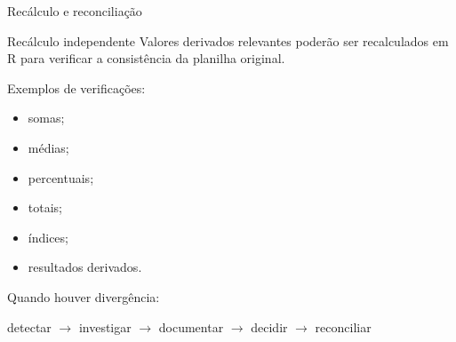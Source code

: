 
\begin{frame}{Recálculo e reconciliação}

    \begin{block}{Recálculo independente}
        Valores derivados relevantes poderão ser recalculados em R para
        verificar a consistência da planilha original.
    \end{block}

    \vspace{0.3cm}

    Exemplos de verificações:

    \begin{itemize}
        \item somas;
        \item médias;
        \item percentuais;
        \item totais;
        \item índices;
        \item resultados derivados.
    \end{itemize}

    \vspace{0.3cm}

    Quando houver divergência:

    \begin{center}
        detectar
        $\rightarrow$
        investigar
        $\rightarrow$
        documentar
        $\rightarrow$
        decidir
        $\rightarrow$
        reconciliar
    \end{center}

\end{frame}



